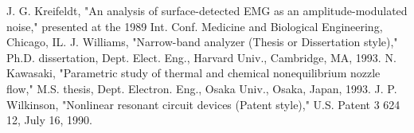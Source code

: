 \documentclass[letterpaper, 10 pt, conference]{ieeeconf}  %
\begin{document}
\begin{thebibliography}{99}
 J. G. Kreifeldt, "An analysis of surface-detected EMG as an amplitude-modulated noise," presented at the 1989 Int. Conf. Medicine and Biological Engineering, Chicago, IL.
 J. Williams, "Narrow-band analyzer (Thesis or Dissertation style)," Ph.D. dissertation, Dept. Elect. Eng., Harvard Univ., Cambridge, MA, 1993. 
 N. Kawasaki, "Parametric study of thermal and chemical nonequilibrium nozzle flow," M.S. thesis, Dept. Electron. Eng., Osaka Univ., Osaka, Japan, 1993.
 J. P. Wilkinson, "Nonlinear resonant circuit devices (Patent style)," U.S. Patent 3 624 12, July 16, 1990. 






\end{thebibliography}
\end{document}
